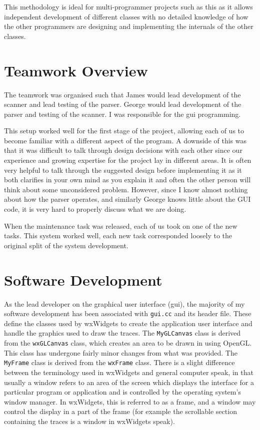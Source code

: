 \documentclass[a4paper,10pt]{article}  %
\begin{document}
This methodology is ideal for multi-programmer projects such as this
as it allows independent development of different classes with no
detailed knowledge of how the other programmers are designing and
implementing the internals of the other classes.

\section{Teamwork Overview}
\label{sec:teamwork-overview}

The teamwork was organised such that James would lead development of
the scanner and lead testing of the parser. George would lead
development of the parser and testing of the scanner. I was
responsible for the gui programming.

This setup worked well for the first stage of the project, allowing
each of us to become familiar with a different aspect of the
program. A downside of this was that it was difficult to talk through
design decisions with each other since our experience and growing
expertise for the project lay in different areas. It is often very
helpful to talk through the suggested design before implementing it as
it both clarifies in your own mind as you explain it and often the
other person will think about some unconsidered problem. However,
since I know almost nothing about how the parser operates, and
similarly George knows little about the GUI code, it is very hard to
properly discuss what we are doing.

When the maintenance task was released, each of us took on one of the
new tasks. This system worked well, each new task corresponded loosely
to the original split of the system development.

\section{Software Development}
\label{sec:software-development}

As the lead developer on the graphical user interface (gui), the
majority of my software development has been associated with
\texttt{gui.cc} and its header file. These define the classes used by
wxWidgets to create the application user interface and handle the
graphics used to draw the traces. The \texttt{MyGLCanvas} class is
derived from the \texttt{wxGLCanvas} class, which creates an area to
be drawn in using OpenGL. This class has undergone fairly minor
changes from what was provided. The \texttt{MyFrame} class is derived
from the \texttt{wxFrame} class. There is a slight difference between
the terminology used in wxWidgets and general computer speak, in that
usually a window refers to an area of the screen which displays the
interface for a particular program or application and is controlled by
the operating system's window manager. In wxWidgets, this is referred
to as a frame, and a window may control the display in a part of the
frame (for example the scrollable section containing the traces is a
window in wxWidgets speak).
\end{document}
